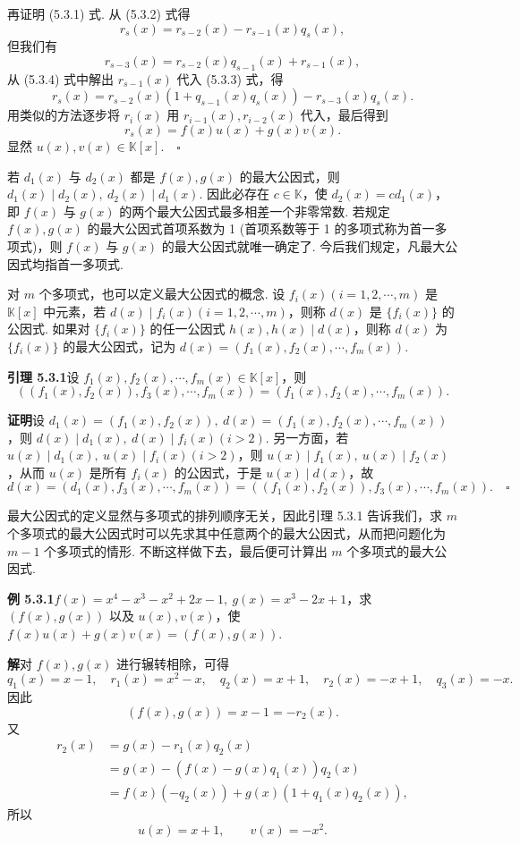 \documentclass[UTF8, 12pt, fontset=fandol, oneside]{ctexart}
\begin{document}
再证明 (5.3.1) 式. 从 (5.3.2) 式得
\begin{equation}
r_s(x)=r_{s-2}(x)-r_{s-1}(x)q_s(x),
\tag{5.3.3}
\end{equation}
但我们有
\begin{equation}
r_{s-3}(x)=r_{s-2}(x)q_{s-1}(x)+r_{s-1}(x),
\tag{5.3.4}
\end{equation}
从 (5.3.4) 式中解出 $r_{s-1}(x)$ 代入 (5.3.3) 式，得
\[
r_s(x)=r_{s-2}(x)(1+q_{s-1}(x)q_s(x))-r_{s-3}(x)q_s(x).
\]
用类似的方法逐步将 $r_i(x)$ 用 $r_{i-1}(x),r_{i-2}(x)$ 代入，最后得到
\[
r_s(x)=f(x)u(x)+g(x)v(x).
\]
显然 $u(x),v(x)\in\mathbb{K}[x].\quad \square$

若 $d_1(x)$ 与 $d_2(x)$ 都是 $f(x),g(x)$ 的最大公因式，则 $d_1(x)\mid d_2(x),\ d_2(x)\mid d_1(x)$. 因此必存在 $c\in\mathbb{K}$，使 $d_2(x)=cd_1(x)$，即 $f(x)$ 与 $g(x)$ 的两个最大公因式最多相差一个非零常数. 若规定 $f(x),g(x)$ 的最大公因式首项系数为 1 (首项系数等于 1 的多项式称为首一多项式)，则 $f(x)$ 与 $g(x)$ 的最大公因式就唯一确定了. 今后我们规定，凡最大公因式均指首一多项式.

对 $m$ 个多项式，也可以定义最大公因式的概念. 设 $f_i(x)(i=1,2,\cdots,m)$ 是 $\mathbb{K}[x]$ 中元素，若 $d(x)\mid f_i(x)(i=1,2,\cdots,m)$，则称 $d(x)$ 是 $\{f_i(x)\}$ 的公因式. 如果对 $\{f_i(x)\}$ 的任一公因式 $h(x),h(x)\mid d(x)$，则称 $d(x)$ 为 $\{f_i(x)\}$ 的最大公因式，记为 $d(x)=(f_1(x),f_2(x),\cdots,f_m(x))$.

\noindent\textbf{引理 5.3.1}\quad 设 $f_1(x),f_2(x),\cdots,f_m(x)\in\mathbb{K}[x]$，则
\[
((f_1(x),f_2(x)),f_3(x),\cdots,f_m(x))=(f_1(x),f_2(x),\cdots,f_m(x)).
\]

\noindent\textbf{证明}\quad 设 $d_1(x)=(f_1(x),f_2(x)),\ d(x)=(f_1(x),f_2(x),\cdots,f_m(x))$，则 $d(x)\mid d_1(x),\ d(x)\mid f_i(x)(i>2)$. 另一方面，若 $u(x)\mid d_1(x),\ u(x)\mid f_i(x)(i>2)$，则 $u(x)\mid f_1(x),\ u(x)\mid f_2(x)$，从而 $u(x)$ 是所有 $f_i(x)$ 的公因式，于是 $u(x)\mid d(x)$，故
\[
d(x)=(d_1(x),f_3(x),\cdots,f_m(x))=((f_1(x),f_2(x)),f_3(x),\cdots,f_m(x)).\quad \square
\]

最大公因式的定义显然与多项式的排列顺序无关，因此引理 5.3.1 告诉我们，求 $m$ 个多项式的最大公因式时可以先求其中任意两个的最大公因式，从而把问题化为 $m-1$ 个多项式的情形. 不断这样做下去，最后便可计算出 $m$ 个多项式的最大公因式.

\noindent\textbf{例 5.3.1}\quad $f(x)=x^4-x^3-x^2+2x-1,\ g(x)=x^3-2x+1$，求 $(f(x),g(x))$ 以及 $u(x),v(x)$，使 $f(x)u(x)+g(x)v(x)=(f(x),g(x))$.

\noindent\textbf{解}\quad 对 $f(x),g(x)$ 进行辗转相除，可得
\[
q_1(x)=x-1,\quad r_1(x)=x^2-x,\quad q_2(x)=x+1,\quad r_2(x)=-x+1,\quad q_3(x)=-x.
\]
因此
\[
(f(x),g(x))=x-1=-r_2(x).
\]
又
\[
\begin{aligned}
r_2(x)&=g(x)-r_1(x)q_2(x)\\
&=g(x)-(f(x)-g(x)q_1(x))q_2(x)\\
&=f(x)(-q_2(x))+g(x)(1+q_1(x)q_2(x)),
\end{aligned}
\]
所以
\[
u(x)=x+1,\qquad v(x)=-x^2.
\]
\end{document}
